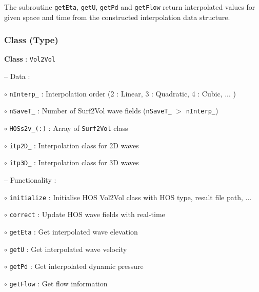 	The subroutine \texttt{getEta}, \texttt{getU}, \texttt{getPd} and \texttt{getFlow} return interpolated values for given space and time from the constructed interpolation data structure.

	\subsubsection{Class (Type)}
	
	\textbf{Class} : \texttt{Vol2Vol}
	
	\hspace{0.5 cm} -- Data :
	
	\hspace{1.0 cm} $\circ$ \texttt{nInterp\_} : Interpolation order (2 : Linear, 3 : Quadratic, 4 : Cubic, ... )
	
	\hspace{1.0 cm} $\circ$ \texttt{nSaveT\_} : Number of Surf2Vol wave fields  (\texttt{nSaveT\_}  $>$ \texttt{nInterp\_})
	
	\hspace{1.0 cm} $\circ$ \texttt{HOSs2v\_(:)} : Array of \texttt{Surf2Vol} class
	
	\hspace{1.0 cm} $\circ$ \texttt{itp2D\_} : Interpolation class for 2D waves
	
	\hspace{1.0 cm} $\circ$ \texttt{itp3D\_} : Interpolation class for 3D waves
	
	\vspace{0.5cm}
	
	\hspace{0.5 cm} -- Functionality :
	
	\hspace{1.0 cm} $\circ$ \texttt{initialize} : Initialise HOS Vol2Vol class with HOS type, result file path, ...
	
	\hspace{1.0 cm} $\circ$ \texttt{correct} : Update HOS wave fields with real-time
	
	\hspace{1.0 cm} $\circ$ \texttt{getEta} : Get interpolated wave elevation 
	
	\hspace{1.0 cm} $\circ$ \texttt{getU} : Get interpolated wave velocity 
	
	\hspace{1.0 cm} $\circ$ \texttt{getPd} : Get interpolated dynamic pressure
	
	\hspace{1.0 cm} $\circ$ \texttt{getFlow} : Get flow information
	
